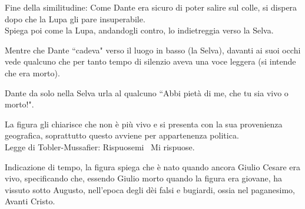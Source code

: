 \documentclass{article}
\begin{document}

Fine della similitudine: Come Dante era sicuro di poter salire sul colle, si dispera dopo che la Lupa gli pare insuperabile.\\
Spiega poi come la Lupa, andandogli contro, lo indietreggia verso la Selva.


Mentre che Dante ``cadeva" verso il luogo in basso (la Selva), davanti ai suoi occhi vede qualcuno che per tanto tempo di silenzio aveva una voce leggera (si intende che era morto).


Dante da solo nella Selva urla al qualcuno ``Abbi pietà di me, che tu sia vivo o morto!".


La figura gli chiarisce che non è più vivo e si presenta con la sua provenienza geografica, soprattutto questo avviene per appartenenza politica.\\
Legge di Tobler-Mussafier: Rispuosemi \textrightarrow\  Mi rispuose.


Indicazione di tempo, la figura spiega che è nato quando ancora Giulio Cesare era vivo, specificando che, essendo Giulio morto quando la figura era giovane, ha vissuto sotto Augusto, nell'epoca degli dèi falsi e bugiardi, ossia nel paganesimo, Avanti Cristo.

\end{document}
